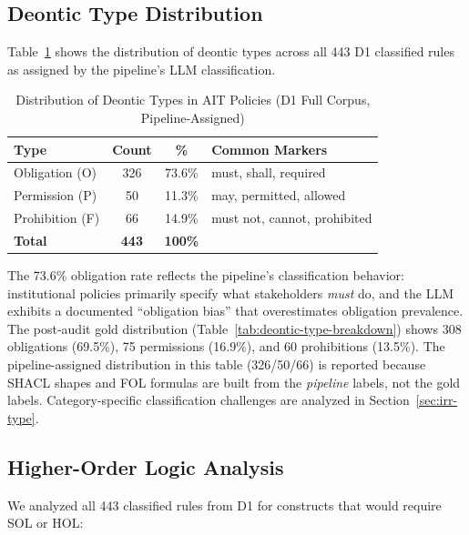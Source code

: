 \subsection{Deontic Type Distribution}

Table~\ref{tab:deontic-distribution} shows the distribution of deontic types across all 443 D1 classified rules as assigned by the pipeline's LLM classification.

\begin{table}[htbp]
\centering
\caption{Distribution of Deontic Types in AIT Policies (D1 Full Corpus, Pipeline-Assigned)}
\label{tab:deontic-distribution}
\begin{tabular}{|l|c|c|l|}
\hline
\textbf{Type} & \textbf{Count} & \textbf{\%} & \textbf{Common Markers} \\
\hline
Obligation (O) & 326 & 73.6\% & must, shall, required \\
Permission (P) & 50 & 11.3\% & may, permitted, allowed \\
Prohibition (F) & 66 & 14.9\% & must not, cannot, prohibited \\
\hline
\textbf{Total} & \textbf{443} & \textbf{100\%} & \\
\hline
\end{tabular}
\end{table}

The 73.6\% obligation rate reflects the pipeline's classification behavior: institutional policies primarily specify what stakeholders \textit{must} do, and the LLM exhibits a documented ``obligation bias'' that overestimates obligation prevalence. The post-audit gold distribution (Table~\ref{tab:deontic-type-breakdown}) shows 308 obligations (69.5\%), 75 permissions (16.9\%), and 60 prohibitions (13.5\%). The pipeline-assigned distribution in this table (326/50/66) is reported because SHACL shapes and FOL formulas are built from the \textit{pipeline} labels, not the gold labels. Category-specific classification challenges are analyzed in Section~\ref{sec:irr-type}.

\subsection{Higher-Order Logic Analysis}

We analyzed all 443 classified rules from D1 for constructs that would require SOL or HOL:

